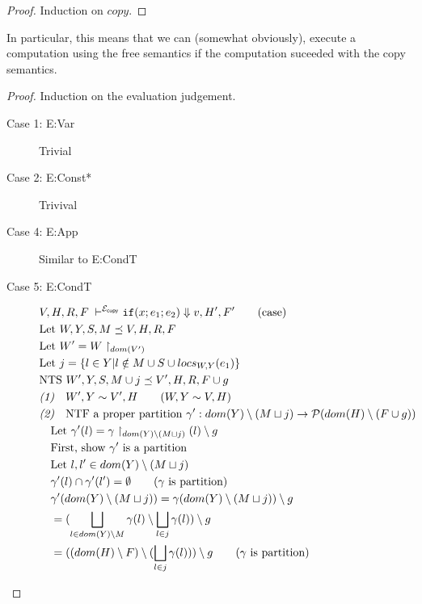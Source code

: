 \documentclass[11pt]{article}
\newcommand{\ms}[1]{\ensuremath{\mathsf{#1}}}
\newcommand{\copySem}{\ensuremath{\mathcal{E}_{\ms{copy}}}}
\theoremstyle{definition}
\begin{document}
\begin{proof}
	Induction on $copy$.
\end{proof}

In particular, this means that we can (somewhat obviously), execute a computation using the free semantics
if the computation suceeded with the copy semantics. 

\begin{proof}
Induction on the evaluation judgement.\\
\begin{description}
  \item[Case 1: E:Var] Trivial
  \item[Case 2: E:Const*] Trivival
  \item[Case 4: E:App] Similar to E:CondT
  \item[Case 5: E:CondT]
  \begin{align*}
		&V,H,R,F \; \vdash^{\copySem} \ifexabt{x}{e_1}{e_2} \Downarrow v, H',F' \tag{case}\\
		&\text{Let } W,Y,S,M \preceq V,H,R,F \\
		&\text{Let } W' = W \restriction_{dom(V')}\\
		&\text{Let } j = \{l \in Y | l \notin M \cup S \cup locs_{W,Y}(e_1) \}\\
		&\text{NTS } W',Y,S,M \cup j \preceq V',H,R,F \cup g\\
		&\emph{(1)}\quad W',Y \sim V',H \tag{$W,Y \sim V,H$}\\
		&\emph{(2)}\quad \text{NTF a proper partition }
		 \gamma' : dom(Y) \setminus (M \sqcup j) \to \mathcal{P}(dom(H)\setminus (F \cup g))  \\
		&\quad \text{Let } \gamma'(l) = \gamma \restriction_{dom(Y)\setminus(M \sqcup j)}(l) \setminus g\\
		&\quad \text{First, show $\gamma'$ is a partition}\\
		&\quad \text{Let } l, l' \in dom(Y) \setminus (M \sqcup j)\\
		&\quad \gamma'(l) \cap \gamma'(l') = \emptyset \tag{$\gamma$ is partition}\\
		&\quad \gamma'(dom(Y) \setminus (M \sqcup j)) = \gamma(dom(Y) \setminus (M \sqcup j)) \setminus g\\
		&\quad = (\bigsqcup_{l \in dom(Y) \setminus M} \gamma(l) \setminus \bigsqcup_{l \in j} \gamma(l)) 
			\setminus g\\
		&\quad = ((dom(H) \setminus F) \setminus (\bigsqcup_{l \in j} \gamma(l))) \setminus g 
			\tag{$\gamma$ is partition}\\

\end{align*}
\end{description}
\end{proof}
\end{document}
